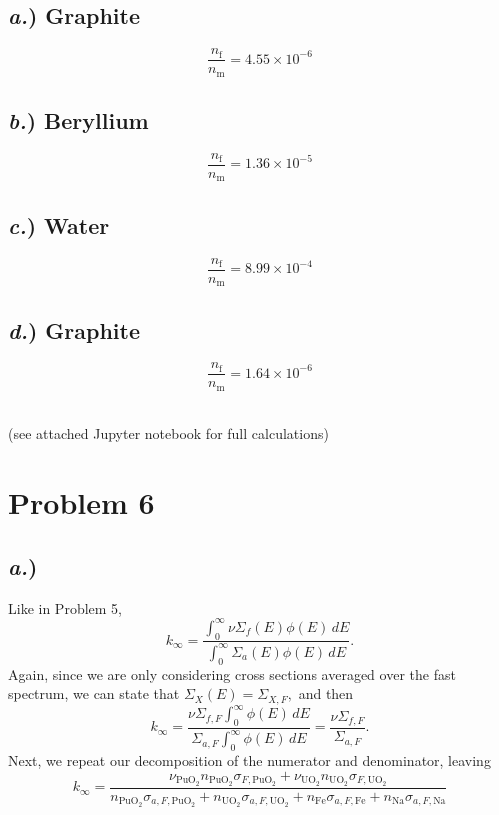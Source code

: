 \documentclass{article}
\begin{document}
\begin{multicols}{4}
\subsection*{\textit{a.}) \normalsize Graphite}
$$ \frac{n_{\text{f}}}{n_{\text{m}}} = 4.55\times10^{-6}$$

\subsection*{\textit{b.}) \normalsize Beryllium}
$$ \frac{n_{\text{f}}}{n_{\text{m}}} = 1.36\times10^{-5}$$

\subsection*{\textit{c.}) \normalsize Water}
$$ \frac{n_{\text{f}}}{n_{\text{m}}} = 8.99\times10^{-4}$$

\subsection*{\textit{d.}) \normalsize Graphite}
$$ \frac{n_{\text{f}}}{n_{\text{m}}} = 1.64\times10^{-6}$$
\end{multicols}

\-\\
(see attached Jupyter notebook for full calculations)




\section*{Problem 6}

\subsection*{\textit{a.})}

Like in Problem 5, 
$$k_{\infty} = \frac{\int_0^{\infty} \nu \Sigma_f(E)\phi(E)\,dE}{\int_0^{\infty} \Sigma_a(E)\phi(E)\,dE} .$$
Again, since we are only considering cross sections averaged over the fast spectrum, we can state that $\Sigma_X(E) = \Sigma_{X,F},$ and then 
$$ k_{\infty} = \frac{\nu \Sigma_{f,F} \int_0^{\infty} \phi(E)\,dE}{\Sigma_{a,F} \int_0^{\infty} \phi(E)\,dE} = \frac{\nu \Sigma_{f,F}}{\Sigma_{a,F}}.$$
Next, we repeat our decomposition of the numerator and denominator, leaving 
$$ k_{\infty} = \frac{\nu_{\text{PuO}_2} n_{\text{PuO}_2} \sigma_{F,\text{PuO}_2} + \nu_{\text{UO}_2} n_{\text{UO}_2} \sigma_{F,\text{UO}_2}}{n_{\text{PuO}_2} \sigma_{a,F,\text{PuO}_2} + n_{\text{UO}_2} \sigma_{a,F,\text{UO}_2} + n_{\text{Fe}} \sigma_{a,F,\text{Fe}} + n_{\text{Na}} \sigma_{a,F,\text{Na}}} $$
\end{document}
